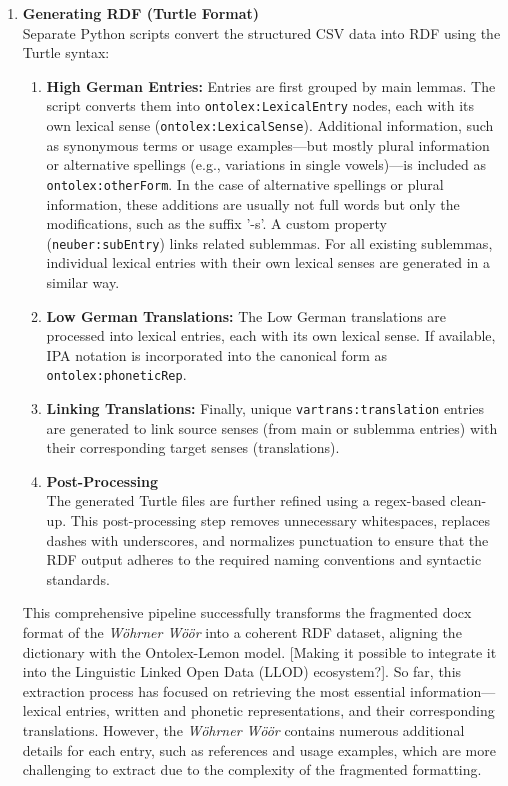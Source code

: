 \documentclass[11pt]{article}
\begin{document}
\begin{enumerate}
    \item {\textbf{Generating RDF (Turtle Format)}}\\ 
    Separate Python scripts convert the structured CSV data into RDF using the Turtle syntax:
    \begin{enumerate}
        \item {\textbf{High German Entries:}} Entries are first grouped by main lemmas. The script converts them into \texttt{ontolex:LexicalEntry} nodes, each with its own lexical sense (\texttt{ontolex:LexicalSense}). Additional information, such as synonymous terms or usage examples—but mostly plural information or alternative spellings (e.g., variations in single vowels)—is included as \texttt{ontolex:otherForm}. In the case of alternative spellings or plural information, these additions are usually not full words but only the modifications, such as the suffix '-s'. A custom property (\texttt{neuber:subEntry}) links related sublemmas. For all existing sublemmas, individual lexical entries with their own lexical senses are generated in a similar way.
        \item {\textbf{Low German Translations:}} The Low German translations are processed into lexical entries, each with its own lexical sense. If available, IPA notation is incorporated into the canonical form as \texttt{ontolex:phoneticRep}.
        \item {\textbf{Linking Translations:}} Finally, unique \texttt{vartrans:translation} entries are generated to link source senses (from main or sublemma entries) with their corresponding target senses (translations).

    \item {\textbf{Post-Processing}}\\  
    The generated Turtle files are further refined using a regex-based clean-up. This post-processing step removes unnecessary whitespaces, replaces dashes with underscores, and normalizes punctuation to ensure that the RDF output adheres to the required naming conventions and syntactic standards.
\end{enumerate}

This comprehensive pipeline successfully transforms the fragmented docx format of the \emph{Wöhrner Wöör} into a coherent RDF dataset, aligning the dictionary with the Ontolex-Lemon model. [Making it possible to integrate it into the Linguistic Linked Open Data (LLOD) ecosystem?]. So far, this extraction process has focused on retrieving the most essential information—lexical entries, written and phonetic representations, and their corresponding translations. However, the \emph{Wöhrner Wöör} contains numerous additional details for each entry, such as references and usage examples, which are more challenging to extract due to the complexity of the fragmented formatting.


\end{enumerate}
\end{document}
